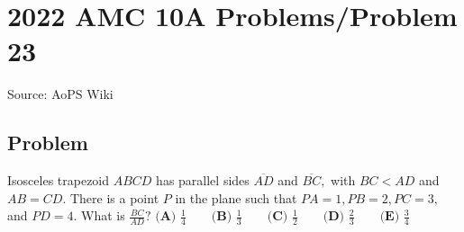 \documentclass[12pt]{article}
\begin{document}
\section*{{2022 AMC 10A Problems/Problem 23}}
Source: AoPS Wiki

\subsection*{Problem}
Isosceles trapezoid $ABCD$ has parallel sides $\overline{AD}$ and $\overline{BC},$ with $BC < AD$ and $AB = CD.$ There is a point $P$ in the plane such that $PA=1, PB=2, PC=3,$ and $PD=4.$ What is $\tfrac{BC}{AD}?$ $\textbf{(A) }\frac{1}{4}\qquad\textbf{(B) }\frac{1}{3}\qquad\textbf{(C) }\frac{1}{2}\qquad\textbf{(D) }\frac{2}{3}\qquad\textbf{(E) }\frac{3}{4}$
\end{document}
